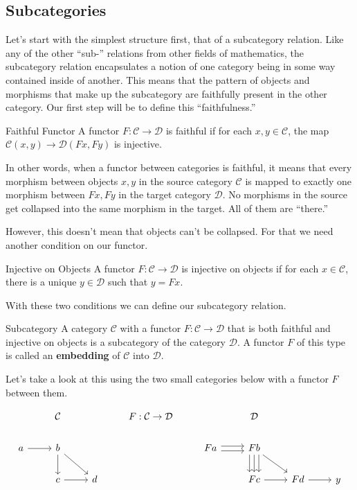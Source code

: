 \documentclass[12pt]{article}
\begin{document}
\subsection*{Subcategories}
Let's start with the simplest structure first, that of a subcategory relation.
Like any of the other ``sub-'' relations from other fields of mathematics, the subcategory relation encapsulates a notion of one category being in some way contained inside of another.
This means that the pattern of objects and morphisms that make up the subcategory are faithfully present in the other category.
Our first step will be to define this ``faithfulness.''

\begin{definition}{Faithful Functor}{}
    A functor $F:\mathcal{C}\rightarrow\mathcal{D}$ is faithful if for each $x,y\in\mathcal{C}$, the map $\mathcal{C}(x, y)\rightarrow\mathcal{D}(Fx,Fy)$ is injective.
\end{definition}
In other words, when a functor between categories is faithful, it means that every morphism between objects $x,y$ in the source category $\mathcal{C}$ is mapped to exactly one morphism between $Fx, Fy$ in the target category $\mathcal{D}$.
No morphisms in the source get collapsed into the same morphism in the target.
All of them are ``there.''

However, this doesn't mean that objects can't be collapsed.
For that we need another condition on our functor.

\begin{definition}{Injective on Objects}{}
    A functor $F:\mathcal{C}\rightarrow\mathcal{D}$ is injective on objects if for each $x\in\mathcal{C}$, there is a unique $y\in\mathcal{D}$ such that $y=Fx$.
\end{definition}

With these two conditions we can define our subcategory relation.

\begin{definition}{Subcategory}{}
    A category $\mathcal{C}$ with a functor $F:\mathcal{C}\rightarrow\mathcal{D}$ that is both faithful and injective on objects is a subcategory of the category $\mathcal{D}$.
    A functor $F$ of this type is called an \textbf{embedding} of $\mathcal{C}$ into $\mathcal{D}$.
\end{definition}

Let's take a look at this using the two small categories below with a functor $F$ between them.

\[\begin{tikzcd}
        & {\mathcal{C}} && {F:\mathcal{C}\rightarrow\mathcal{D}} && {\mathcal{D}} \\
        a & b &&& Fa & Fb \\
        & c & d &&& Fc & Fd & y
        \arrow[from=2-1, to=2-2]
        \arrow[from=2-2, to=3-2]
        \arrow[from=3-2, to=3-3]
        \arrow[from=2-2, to=3-3]
        \arrow[shift left, from=2-5, to=2-6]
        \arrow[shift left=2, from=2-6, to=3-6]
        \arrow[from=2-6, to=3-7]
        \arrow[from=3-6, to=3-7]
        \arrow[shift right, from=2-5, to=2-6]
        \arrow[shift right=2, from=2-6, to=3-6]
        \arrow[from=2-6, to=3-6]
        \arrow[from=3-7, to=3-8]
    \end{tikzcd}\]
\end{document}
